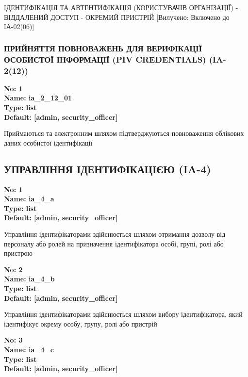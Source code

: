 \documentclass{article}
\begin{document}
{\footnotesize ІДЕНТИФІКАЦІЯ ТА АВТЕНТИФІКАЦІЯ (КОРИСТУВАЧІВ ОРГАНІЗАЦІЇ) - ВІДДАЛЕНИЙ ДОСТУП - ОКРЕМИЙ ПРИСТРІЙ [Вилучено: Включено до ІА-02(06)]}




\subsubsection{ПРИЙНЯТТЯ ПОВНОВАЖЕНЬ ДЛЯ ВЕРИФІКАЦІЇ ОСОБИСТОЇ ІНФОРМАЦІЇ (PIV CREDENTIALS) (IA-2(12))}


\vspace{10pt}
{\footnotesize\bfseries
No: 1\\
Name: ia\_\allowbreak{}2\_\allowbreak{}12\_\allowbreak{}01\\
Type: list\\
Default: [\textquotedbl{}admin\textquotedbl{}, \textquotedbl{}security\_\allowbreak{}officer\textquotedbl{}]
}

{\footnotesize Приймаються та електронним шляхом підтверджуються повноваження облікових даних особистої ідентифікації}




\subsection{УПРАВЛІННЯ ІДЕНТИФІКАЦІЄЮ (IA-4)}


\vspace{10pt}
{\footnotesize\bfseries
No: 1\\
Name: ia\_\allowbreak{}4\_\allowbreak{}a\\
Type: list\\
Default: [\textquotedbl{}admin\textquotedbl{}, \textquotedbl{}security\_\allowbreak{}officer\textquotedbl{}]
}

{\footnotesize Управління ідентифікаторами здійснюється шляхом отримання дозволу від персоналу або ролей на призначення ідентифікатора особі, групі, ролі або пристрою}


{\footnotesize\bfseries
No: 2\\
Name: ia\_\allowbreak{}4\_\allowbreak{}b\\
Type: list\\
Default: [\textquotedbl{}admin\textquotedbl{}, \textquotedbl{}security\_\allowbreak{}officer\textquotedbl{}]
}

{\footnotesize Управління ідентифікаторами здійснюється шляхом вибору ідентифікатора, який ідентифікує окрему особу, групу, ролі або пристрій}


{\footnotesize\bfseries
No: 3\\
Name: ia\_\allowbreak{}4\_\allowbreak{}c\\
Type: list\\
Default: [\textquotedbl{}admin\textquotedbl{}, \textquotedbl{}security\_\allowbreak{}officer\textquotedbl{}]
}
\end{document}
